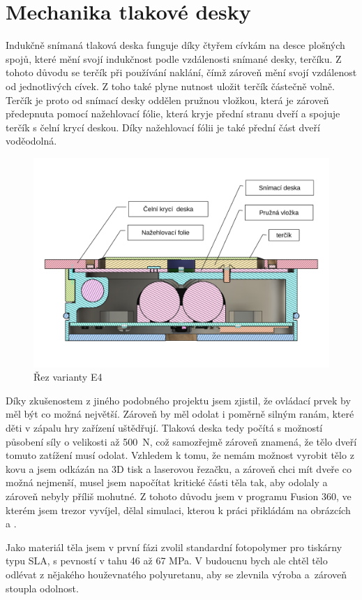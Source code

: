 \section{Mechanika tlakové desky}
\label{E4-mech_tlakovky}

Indukčně snímaná tlaková deska funguje díky čtyřem cívkám na desce ploš\-ných spojů, které mění svojí indukčnost podle vzdálenosti snímané desky, terčíku.
Z tohoto důvodu se terčík při používání naklání, čímž zároveň mění svojí vzdálenost od jednotlivých cívek. Z toho také plyne nutnost uložit terčík
částečně volně. Terčík je proto od snímací desky oddělen pružnou vložkou, která je zároveň předepnuta pomocí nažehlovací fólie, která kryje přední 
stranu dveří a spojuje terčík s čelní krycí deskou. Díky nažehlovací fólii je také přední část dveří voděodolná.

\begin{figure}[h]
    \centering
    \includegraphics[width=\textwidth]{kapitoly/obrazky/E4/machanika_tlakove_desky/rez_po_ose.pdf}
    \caption{Řez varianty E4}
    \label{fig:E4-rez}
\end{figure}

Díky zkušenostem z jiného podobného projektu jsem zjistil, že ovládací prvek by měl být co možná největší. 
Zároveň by měl odolat i poměrně silným ranám, které děti v zápalu hry zařízení uštědřují.
Tlaková deska tedy počítá s možností působení síly o velikosti až 500~N, což samozřejmě zároveň znamená, že tělo dveří tomuto zatížení musí odolat.
Vzhledem k tomu, že nemám možnost vyrobit tělo z kovu a jsem odkázán na 3D tisk a laserovou řezačku, a zároveň chci mít dveře co možná nejmenší,
musel jsem napočítat kritické části těla tak, aby odolaly a zároveň nebyly příliš mohutné. Z tohoto důvodu jsem v programu Fusion 360, ve kterém jsem trezor vyvíjel,
dělal simulaci, kterou k práci přikládám na obrázcích  a .

Jako materiál těla jsem v první fázi zvolil standardní fotopolymer pro tiskárny typu SLA, s pevností v tahu 46 až 67 MPa.
V budoucnu bych ale chtěl tělo odlévat z nějakého houževnatého polyuretanu, aby se zlevnila výroba a~zároveň stoupla odolnost.

